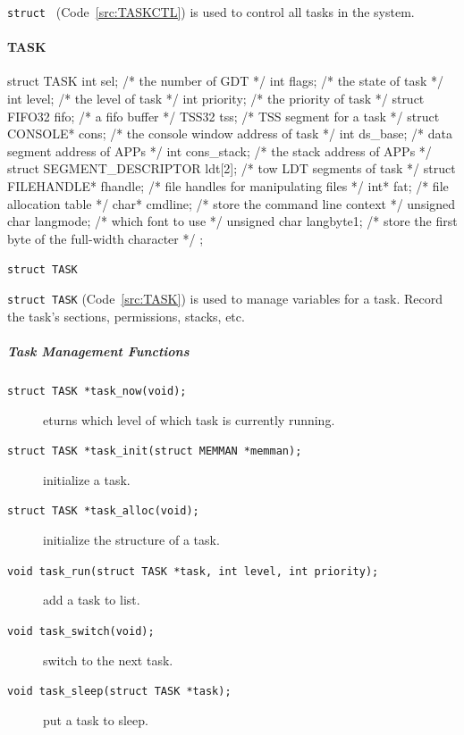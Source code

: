 \documentclass{swfcthesis}
\begin{document}
\texttt{struct } (Code~\ref{src:TASKCTL}) is used to control all tasks in the system.



\paragraph{TASK}

\begin{listing}[H]
  \begin{codeblock}
\begin{ccode}
struct TASK
{ 
  int sel;                          /* the number of GDT */
  int flags;                        /* the state of task */
  int level;                        /* the level of task */
  int priority;                     /* the priority of task */
  struct FIFO32 fifo;               /* a fifo buffer */
  TSS32 tss;                        /* TSS segment for a task */
  struct CONSOLE* cons;             /* the console window address of task */
  int ds_base;                      /* data segment address of APPs */
  int cons_stack;                   /* the stack address of APPs */
  struct SEGMENT_DESCRIPTOR ldt[2]; /* tow LDT segments of task */
  struct FILEHANDLE* fhandle;       /* file handles for manipulating files */
  int* fat;                         /* file allocation table */
  char* cmdline;                    /* store the command line context */
  unsigned char langmode;           /* which font to use */
  unsigned char langbyte1;          /* store the first byte of the full-width character */
};
\end{ccode}
  \end{codeblock}
  \caption{\texttt{struct TASK}}\label{src:TASK}
\end{listing}

\texttt{struct TASK} (Code~\ref{src:TASK}) is used to manage variables for a task. Record
the task's sections, permissions, stacks, etc. 



\subparagraph{Task Management Functions}

\begin{description}
\item[\texttt{struct TASK *task_now(void);}] eturns which level of which task is
  currently running.
  
\item[\texttt{struct TASK *task_init(struct MEMMAN *memman);}] initialize a task.

\item[\texttt{struct TASK *task_alloc(void);}] initialize the structure of a task.

\item[\texttt{void task_run(struct TASK *task, int level, int priority);}] add a
  task to list.

\item[\texttt{void task_switch(void);}] switch to the next task.

\item[\texttt{void task_sleep(struct TASK *task);}] put a task to sleep.
\end{description}
\end{document}
